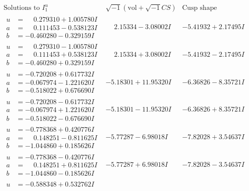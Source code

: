 \documentclass[1p]{elsarticle_modified}
\theoremstyle{definition}
\newcommand{\I}{\sqrt{-1}}
\begin{document}
$$\begin{array}{c|c|c}  
\text{Solutions to }I^u_{1}& \I (\text{vol} + \sqrt{-1}CS) & \text{Cusp shape}\\
 \hline 
\begin{aligned}
u &= \phantom{-}0.279310 + 1.005780 I \\
a &= \phantom{-}0.111453 - 0.538123 I \\
b &= -0.460280 - 0.329159 I\end{aligned}
 & \phantom{-}2.15334 - 3.08002 I & -5.41932 + 2.17495 I \\ \hline\begin{aligned}
u &= \phantom{-}0.279310 - 1.005780 I \\
a &= \phantom{-}0.111453 + 0.538123 I \\
b &= -0.460280 + 0.329159 I\end{aligned}
 & \phantom{-}2.15334 + 3.08002 I & -5.41932 - 2.17495 I \\ \hline\begin{aligned}
u &= -0.720208 + 0.617732 I \\
a &= -0.067974 - 1.221620 I \\
b &= -0.518022 + 0.676690 I\end{aligned}
 & -5.18301 + 11.95320 I & -6.36826 - 8.35721 I \\ \hline\begin{aligned}
u &= -0.720208 - 0.617732 I \\
a &= -0.067974 + 1.221620 I \\
b &= -0.518022 - 0.676690 I\end{aligned}
 & -5.18301 - 11.95320 I & -6.36826 + 8.35721 I \\ \hline\begin{aligned}
u &= -0.778368 + 0.420776 I \\
a &= \phantom{-}0.148251 - 0.811625 I \\
b &= -1.044860 + 0.185626 I\end{aligned}
 & -5.77287 - 6.98018 I & -7.82028 + 3.54637 I \\ \hline\begin{aligned}
u &= -0.778368 - 0.420776 I \\
a &= \phantom{-}0.148251 + 0.811625 I \\
b &= -1.044860 - 0.185626 I\end{aligned}
 & -5.77287 + 6.98018 I & -7.82028 - 3.54637 I \\ \hline\begin{aligned}
u &= -0.588348 + 0.532762 I \\

\end{aligned}
\end{array}$$
\end{document}
